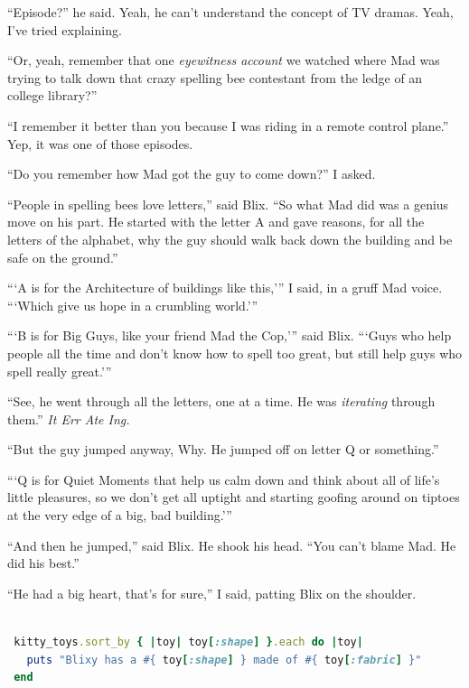 \documentclass[10pt,twoside]{report}
\begin{document}
``Episode?'' he said.  Yeah, he can't understand the concept of TV
dramas.  Yeah, I've tried explaining.

``Or, yeah, remember that one {\em eyewitness account} we watched
where Mad was trying to talk down that crazy spelling bee contestant
from the ledge of an college library?''

``I remember it better than you because I was riding in a remote
control plane.''  Yep, it was one of those episodes.

``Do you remember how Mad got the guy to come down?'' I asked.

``People in spelling bees love letters,'' said Blix.  ``So what Mad
did was a genius move on his part. He started with the letter A and
gave reasons, for all the letters of the alphabet, why the guy should
walk back down the building and be safe on the ground.''

```A is for the Architecture of buildings like this,''' I said, in a
gruff Mad voice. ```Which give us hope in a crumbling world.'''

```B is for Big Guys, like your friend Mad the Cop,''' said Blix.
```Guys who help people all the time and don't know how to spell too
great, but still help guys who spell really great.'''

``See, he went through all the letters, one at a time.  He was {\em
  iterating} through them.'' {\em It Err Ate Ing.}

``But the guy jumped anyway, Why.  He jumped off on letter Q or
something.''

```Q is for Quiet Moments that help us calm down and think about all
of life's little pleasures, so we don't get all uptight and starting
goofing around on tiptoes at the very edge of a big, bad building.'''

``And then he jumped,'' said Blix.  He shook his head.  ``You can't
blame Mad.  He did his best.''

``He had a big heart, that's for sure,'' I said, patting Blix on the
shoulder.


\begin{lstlisting}[basicstyle=\ttfamily\color{basiccolor},
    commentstyle = \ttfamily\color{commentcolor},
    keywordstyle=\ttfamily\color{keywordscolor},
    stringstyle=\color{stringcolor},
    language=Ruby,
    basicstyle=\small\ttfamily,
    showstringspaces=false,
  ]

 kitty_toys.sort_by { |toy| toy[:shape] }.each do |toy|
   puts "Blixy has a #{ toy[:shape] } made of #{ toy[:fabric] }"
 end

\end{lstlisting}
\end{document}
